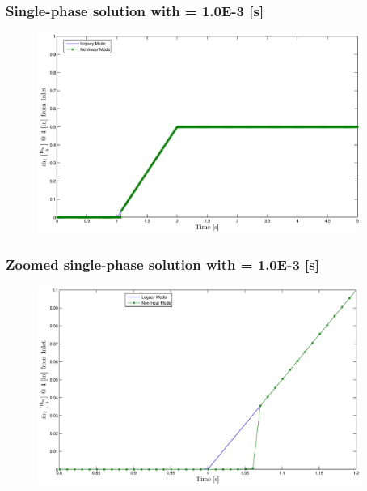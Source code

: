 \documentclass[compress,xcolor=table]{beamer}
\begin{document}
\begin{frame}
\frametitle{Single-phase solution with \dtmax{} = 1.0E-3 {[s]}}

\begin{figure}[h!t]
\centering
\includegraphics[width=0.94\textwidth]{images/single_1em3.eps}
\end{figure}

\end{frame}
\begin{frame}
\frametitle{Zoomed single-phase solution with \dtmax{} = 1.0E-3 {[s]}}

\begin{figure}[h!t]
\centering
\includegraphics[width=0.94\textwidth]{images/single_1em3_zoom.eps}
\end{figure}

\end{frame}
\end{document}
